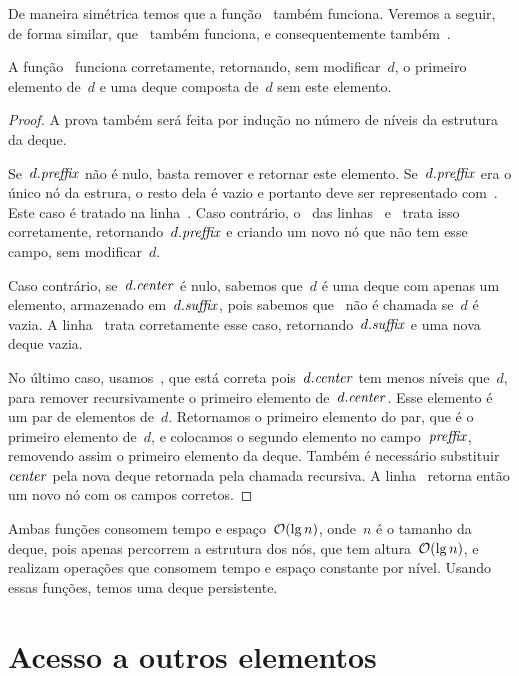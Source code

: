 \documentclass[main.tex]{subfiles}
\begin{document}
De maneira simétrica temos que a função~ também funciona. Veremos a seguir, de forma similar, que~ também funciona, e consequentemente também~.

\begin{proposition}
A função~ funciona corretamente, retornando, sem modificar~$d$, o primeiro elemento de~$d$ e uma deque composta de~$d$ sem este elemento.
\end{proposition}

\begin{proof}
A prova também será feita por indução no número de níveis da estrutura da deque.

    Se~$d.\mathit{preffix}$ não é nulo, basta remover e retornar este elemento. Se~$d.\mathit{preffix}$ era o único nó da estrura, o resto dela é vazio e portanto deve ser representado com~. Este caso é tratado na linha~. Caso contrário, o~ das linhas~ e~ trata isso corretamente, retornando~$d.\mathit{preffix}$ e criando um novo nó que não tem esse campo, sem modificar~$d$.

Caso contrário, se~$d.\mathit{center}$ é nulo, sabemos que~$d$ é uma deque com apenas um elemento, armazenado em~$d.\mathit{suffix}$, pois sabemos que~ não é chamada se~$d$ é vazia. A linha~ trata corretamente esse caso, retornando~$d.\mathit{suffix}$ e uma nova deque vazia.

No último caso, usamos~, que está correta pois~$d.\mathit{center}$ tem menos níveis que~$d$, para remover recursivamente o primeiro elemento de~$d.\mathit{center}$. Esse elemento é um par de elementos de~$d$. Retornamos o primeiro elemento do par, que é o primeiro elemento de~$d$, e colocamos o segundo elemento no campo~$\mathit{preffix}$, removendo assim o primeiro elemento da deque. Também é necessário substituir~$\mathit{center}$ pela nova deque retornada pela chamada recursiva. A linha~ retorna então um novo nó com os campos corretos.
\end{proof}

Ambas funções consomem tempo e espaço~$\mathcal{O}(\lg n)$, onde~$n$ é o tamanho da deque, pois apenas percorrem a estrutura dos nós, que tem altura~$\mathcal{O}(\lg n)$, e realizam operações que consomem tempo e espaço constante por nível. Usando essas funções, temos uma deque persistente.

\section{Acesso a outros elementos}
\end{document}

